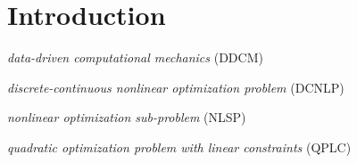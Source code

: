 \section{Introduction}

\noindent \textit{data-driven computational mechanics} (DDCM)

\noindent \textit{discrete-continuous nonlinear optimization problem} (DCNLP)

\noindent \textit{nonlinear optimization sub-problem} (NLSP)

\noindent \textit{quadratic optimization problem with linear constraints} (QPLC)